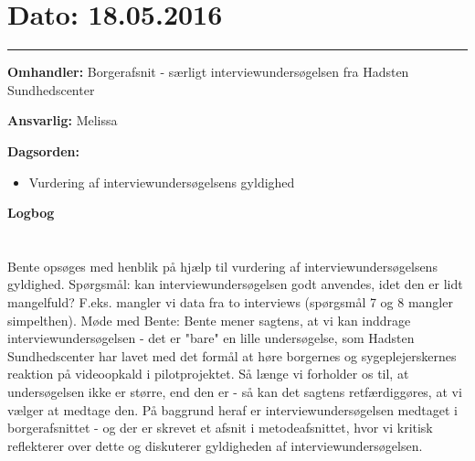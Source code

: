 \section{Dato: 18.05.2016}
\hrule

\textbf{Omhandler:} Borgerafsnit - særligt interviewundersøgelsen fra Hadsten Sundhedscenter

\textbf{Ansvarlig:} Melissa

\textbf{Dagsorden:}
\begin{itemize}
	\item Vurdering af interviewundersøgelsens gyldighed
	
\end{itemize}

\textbf{Logbog}
\\
\\ \\
Bente opsøges med henblik på hjælp til vurdering af interviewundersøgelsens gyldighed. 
Spørgsmål: kan interviewundersøgelsen godt anvendes, idet den er lidt mangelfuld? F.eks. mangler vi data fra to interviews (spørgsmål 7 og 8 mangler simpelthen).
Møde med Bente: 
Bente mener sagtens, at vi kan inddrage interviewundersøgelsen - det er "bare" en lille undersøgelse, som Hadsten Sundhedscenter har lavet med det formål at høre borgernes og sygeplejerskernes reaktion på videoopkald i pilotprojektet. Så længe vi forholder os til, at undersøgelsen ikke er større, end den er - så kan det sagtens retfærdiggøres, at vi vælger at medtage den.
På baggrund heraf er interviewundersøgelsen medtaget i borgerafsnittet - og der er skrevet et afsnit i metodeafsnittet, hvor vi kritisk reflekterer over dette og diskuterer gyldigheden af interviewundersøgelsen. 